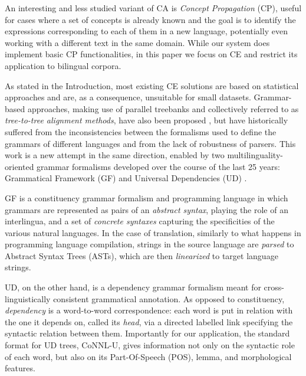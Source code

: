 \documentclass[11pt]{article}
\begin{document}
An interesting and less studied variant of CA is \textit{Concept Propagation} (CP), useful for cases where a set of concepts is already known and the goal is to identify the expressions corresponding to each of them in a new language, potentially even working with a different text in the same domain.
While our system does implement basic CP functionalities, in this paper we focus on CE and restrict its application to bilingual corpora. 

As stated in the Introduction, most existing CE solutions are based on statistical approaches and are, as a consequence, unsuitable for small datasets. 
Grammar-based approaches, making use of parallel treebanks and collectively referred to as \textit{tree-to-tree alignment methods}, have also been proposed \cite{tiedemann2011bitext}, but have historically suffered from the inconsistencies between the formalisms used to define the grammars of different languages and from the lack of robustness of parsers.
This work is a new attempt in the same direction, enabled by two multilinguality-oriented grammar formalisms developed over the course of the last 25 years: Grammatical Framework (GF) \cite{ranta-2011} and Universal Dependencies (UD) \cite{ws-2019-universal}.

GF is a constituency grammar formalism and programming language in which grammars are represented as pairs of an \textit{abstract syntax}, playing the role of an interlingua, and a set of \textit{concrete syntaxes} capturing the specificities of the various natural languages. 
In the case of translation, similarly to what happens in programming language compilation, strings in the source language are \textit{parsed} to Abstract Syntax Trees (ASTs), which are then \textit{linearized} to target language strings.

UD, on the other hand, is a dependency grammar formalism meant for cross-linguistically consistent grammatical annotation.
As opposed to constituency, \textit{dependency} is a word-to-word correspondence: each word is put in relation with the one it depends on, called its \textit{head}, via a directed labelled link specifying the syntactic relation between them.
Importantly for our application, the standard format for UD trees, CoNNL-U, gives information not only on the syntactic role of each word, but also on its Part-Of-Speech (POS), lemma, and morphological features.  
\end{document}
